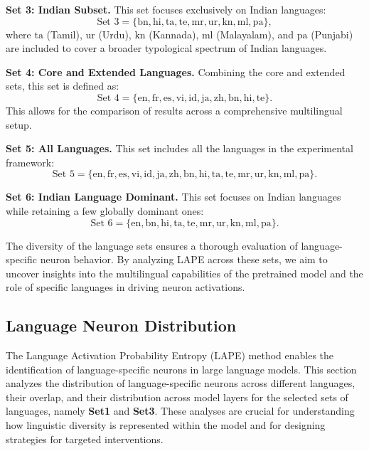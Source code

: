 \textbf{Set 3: Indian Subset.} This set focuses exclusively on Indian languages:
\[
\text{Set 3} = \{\text{bn}, \text{hi}, \text{ta}, \text{te}, \text{mr}, \text{ur}, \text{kn}, \text{ml}, \text{pa}\},
\]
where \(\text{ta}\) (Tamil), \(\text{ur}\) (Urdu), \(\text{kn}\) (Kannada), \(\text{ml}\) (Malayalam), and \(\text{pa}\) (Punjabi) are included to cover a broader typological spectrum of Indian languages.

\textbf{Set 4: Core and Extended Languages.} Combining the core and extended sets, this set is defined as:
\[
\text{Set 4} = \{\text{en}, \text{fr}, \text{es}, \text{vi}, \text{id}, \text{ja}, \text{zh}, \text{bn}, \text{hi}, \text{te}\}.
\]
This allows for the comparison of results across a comprehensive multilingual setup.

\textbf{Set 5: All Languages.} This set includes all the languages in the experimental framework:
\[
\text{Set 5} = \{\text{en}, \text{fr}, \text{es}, \text{vi}, \text{id}, \text{ja}, \text{zh}, \text{bn}, \text{hi}, \text{ta}, \text{te}, \text{mr}, \text{ur}, \text{kn}, \text{ml}, \text{pa}\}.
\]

\textbf{Set 6: Indian Language Dominant.} This set focuses on Indian languages while retaining a few globally dominant ones:
\[
\text{Set 6} = \{\text{en}, \text{bn}, \text{hi}, \text{ta}, \text{te}, \text{mr}, \text{ur}, \text{kn}, \text{ml}, \text{pa}\}.
\]

The diversity of the language sets ensures a thorough evaluation of language-specific neuron behavior. By analyzing LAPE across these sets, we aim to uncover insights into the multilingual capabilities of the pretrained model and the role of specific languages in driving neuron activations.

\subsection{Language Neuron Distribution}

The Language Activation Probability Entropy (LAPE) method enables the identification of language-specific neurons in large language models. This section analyzes the distribution of language-specific neurons across different languages, their overlap, and their distribution across model layers for the selected sets of languages, namely \textbf{Set1} and \textbf{Set3}. These analyses are crucial for understanding how linguistic diversity is represented within the model and for designing strategies for targeted interventions.

